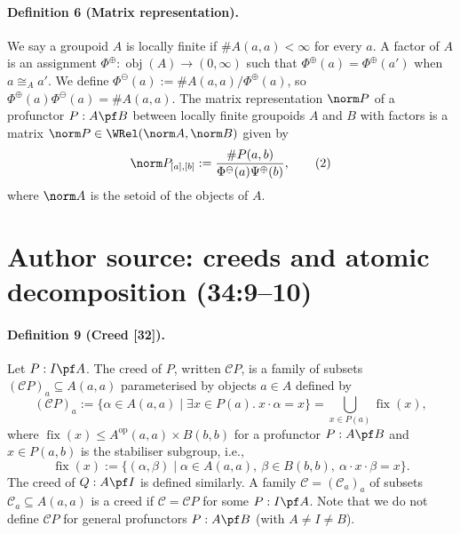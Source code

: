 \paragraph{Definition 6 (Matrix representation).}
We say a groupoid $A$ is locally finite if $\#A(a,a)<\infty$ for every $a$. A factor of $A$ is an assignment $\Phi^\oplus:\operatorname{obj}(A)\to(0,\infty)$ such that $\Phi^\oplus(a)=\Phi^\oplus(a')$ when $a\cong_A a'$. We define $\Phi^\ominus(a):=\#A(a,a)/\Phi^\oplus(a)$, so $\Phi^\oplus(a)\Phi^\ominus(a)=\#A(a,a)$.
The matrix representation $\norm P$ of a profunctor $P:A\pf B$ between locally finite groupoids $A$ and $B$ with factors is a matrix $\norm P\in\WRel(\norm A,\norm B)$ given by
\begin{equation}
\norm P_{[a],[b]}:=\frac{\#P(a,b)}{\Phi^\ominus(a)\Psi^\oplus(b)},\tag{2}
\end{equation}
where $\norm A$ is the setoid of the objects of $A$.
\section*{Author source: creeds and atomic decomposition (34:9--10)}
\paragraph{Definition 9 (Creed [32]).}
Let $P:I\pf A$. The creed of $P$, written $\mathcal CP$, is a family of subsets $(\mathcal CP)_a\subseteq A(a,a)$ parameterised by objects $a\in A$ defined by
\[
(\mathcal CP)_a:=\{\alpha\in A(a,a)\mid\exists x\in P(a).\ x\cdot\alpha=x\}
=\bigcup_{x\in P(a)}\operatorname{fix}(x),
\]
where $\operatorname{fix}(x)\le A^{\mathrm{op}}(a,a)\times B(b,b)$ for a profunctor $P:A\pf B$ and $x\in P(a,b)$ is the stabiliser subgroup, i.e.,
\[
\operatorname{fix}(x):=\{(\alpha,\beta)\mid\alpha\in A(a,a),\ \beta\in B(b,b),\ \alpha\cdot x\cdot\beta=x\}.
\]
The creed of $Q:A\pf I$ is defined similarly. A family $\mathcal C=(\mathcal C_a)_a$ of subsets $\mathcal C_a\subseteq A(a,a)$ is a creed if $\mathcal C=\mathcal CP$ for some $P:I\pf A$.
Note that we do not define $\mathcal CP$ for general profunctors $P:A\pf B$ (with $A\ne I\ne B$).
